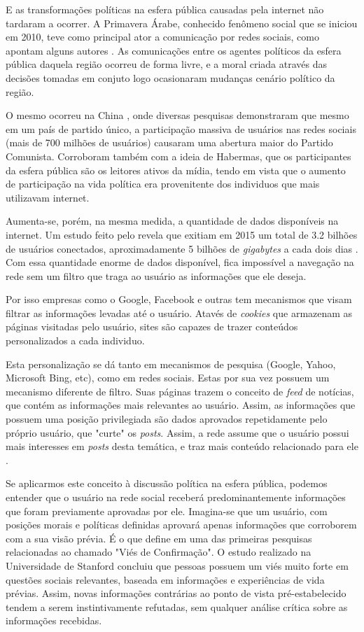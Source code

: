 \documentclass[
	12pt,				%
	oneside,			%
	a4paper,			%
	english,			%
	brazil				%
	]{abntex2ppgsi}
\begin{document}
E as transformações políticas na esfera pública causadas pela internet não tardaram a ocorrer. A Primavera Árabe, conhecido fenômeno social que se iniciou em 2010, teve como principal ator a comunicação por redes sociais, como apontam alguns autores \cite{vivian,ferabolli}. As comunicações entre os agentes políticos da esfera pública daquela região ocorreu de forma livre, e a moral criada através das decisões tomadas em conjuto logo ocasionaram mudanças cenário político da região. 

O mesmo ocorreu na China \cite{liu}, onde diversas pesquisas demonstraram que mesmo em um país de partido único, a participação massiva de usuários nas redes sociais (mais de 700 milhões de usuários) causaram uma abertura maior do Partido Comunista. Corroboram também com a ideia de Habermas, que os participantes da esfera pública são os leitores ativos da mídia, tendo em vista que o aumento de participação na vida política era provenitente dos individuos que mais utilizavam internet.

Aumenta-se, porém, na mesma medida, a quantidade de dados disponíveis na internet. Um estudo feito pelo  revela que exitiam em 2015 um total de 3.2 bilhões de usuários conectados, aproximadamente 5 bilhões de \textit{gigabytes} a cada dois dias \cite{parisier_data}. Com essa quantidade enorme de dados disponível, fica impossível a navegação na rede sem um filtro que traga ao usuário as informações que ele deseja. 

Por isso empresas como o Google, Facebook e outras tem mecanismos que visam filtrar as informações levadas até o usuário. Atavés de \textit{cookies} que armazenam as páginas visitadas pelo usuário, sites são capazes de trazer conteúdos personalizados a cada individuo. 

Esta personalização se dá tanto em mecanismos de pesquisa (Google, Yahoo, Microsoft Bing, etc), como em redes sociais. Estas por sua vez possuem um mecanismo diferente de filtro. Suas páginas trazem o conceito de \textit{feed} de notícias, que contém as informações mais relevantes ao usuário. Assim, as informações que possuem uma posição privilegiada são dados aprovados repetidamente pelo próprio usuário, que "curte" os \textit{posts}. Assim, a rede assume que o usuário possui mais interesses em \textit{posts} desta temática, e traz mais conteúdo relacionado para ele \cite{luckerson,parisier}.

Se aplicarmos este conceito à discussão política na esfera pública, podemos entender que o usuário na rede social receberá predominantemente informações que foram previamente aprovadas por ele. Imagina-se que um usuário, com posições morais e políticas definidas aprovará apenas informações que corroborem com a sua visão prévia. É o que define  em uma das primeiras pesquisas relacionadas ao chamado "Viés de Confirmação". O estudo realizado na Universidade de Stanford concluiu que pessoas possuem um viés muito forte em questões sociais relevantes, baseada em informações e experiências de vida prévias. Assim, novas informações contrárias ao ponto de vista pré-estabelecido tendem a serem instintivamente refutadas, sem qualquer análise crítica sobre as informações recebidas. 
\end{document}

